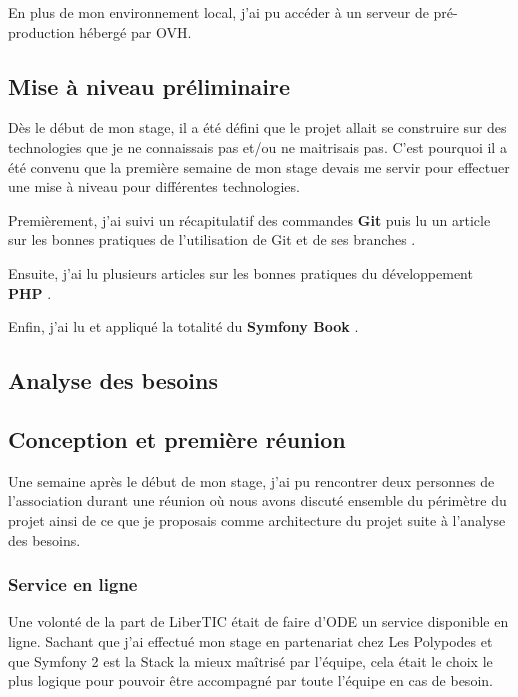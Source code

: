 En plus de mon environnement local, j'ai pu accéder à un serveur de pré-production hébergé par OVH.

\subsection{Mise à niveau préliminaire}

Dès le début de mon stage, il a été défini que le projet allait se construire sur des technologies que je ne connaissais pas et/ou ne maitrisais pas. C'est pourquoi il a été convenu que la première semaine de mon stage devais me servir pour effectuer une mise à niveau pour différentes technologies.

Premièrement, j'ai suivi un récapitulatif des commandes \textbf{Git}  puis lu un article sur les bonnes pratiques de l'utilisation de Git et de ses branches .

Ensuite, j'ai lu plusieurs articles sur les bonnes pratiques du développement \textbf{PHP}  .

Enfin, j'ai lu et appliqué la totalité du \textbf{Symfony Book} .

\subsection{Analyse des besoins}

\subsection{Conception et première réunion}

Une semaine après le début de mon stage, j'ai pu rencontrer deux personnes de l'association durant une réunion où nous avons discuté ensemble du périmètre du projet ainsi de ce que je proposais comme architecture du projet suite à l'analyse des besoins.

\subsubsection*{Service en ligne}

Une volonté de la part de LiberTIC était de faire d'ODE un service disponible en ligne. 
Sachant que j'ai effectué mon stage en partenariat chez Les Polypodes et que Symfony 2 est la Stack la mieux maîtrisé par l'équipe, cela était le choix le plus logique pour pouvoir être accompagné par toute l'équipe en cas de besoin.


